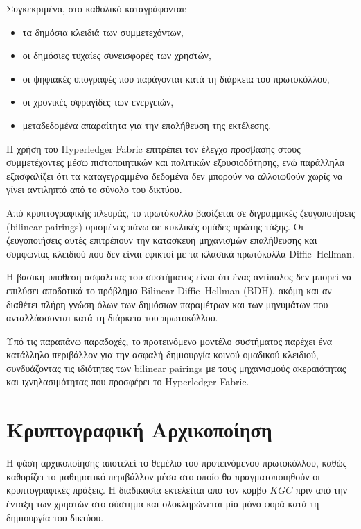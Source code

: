\documentclass[12pt,a4paper]{report}
\begin{document}
Συγκεκριμένα, στο καθολικό καταγράφονται:

\begin{itemize}
\item τα δημόσια κλειδιά των συμμετεχόντων,
\item οι δημόσιες τυχαίες συνεισφορές των χρηστών,
\item οι ψηφιακές υπογραφές που παράγονται κατά τη διάρκεια του πρωτοκόλλου,
\item οι χρονικές σφραγίδες των ενεργειών,
\item μεταδεδομένα απαραίτητα για την επαλήθευση της εκτέλεσης.
\end{itemize}

Η χρήση του Hyperledger Fabric επιτρέπει τον έλεγχο πρόσβασης στους συμμετέχοντες μέσω πιστοποιητικών και πολιτικών εξουσιοδότησης, ενώ παράλληλα εξασφαλίζει ότι τα καταγεγραμμένα δεδομένα δεν μπορούν να αλλοιωθούν χωρίς να γίνει αντιληπτό από το σύνολο του δικτύου.

Από κρυπτογραφικής πλευράς, το πρωτόκολλο βασίζεται σε διγραμμικές ζευγοποιήσεις (bilinear pairings) ορισμένες πάνω σε κυκλικές ομάδες πρώτης τάξης. Οι ζευγοποιήσεις αυτές επιτρέπουν την κατασκευή μηχανισμών επαλήθευσης και συμφωνίας κλειδιού που δεν είναι εφικτοί με τα κλασικά πρωτόκολλα Diffie--Hellman.

Η βασική υπόθεση ασφάλειας του συστήματος είναι ότι ένας αντίπαλος δεν μπορεί να επιλύσει αποδοτικά το πρόβλημα Bilinear Diffie--Hellman (BDH), ακόμη και αν διαθέτει πλήρη γνώση όλων των δημόσιων παραμέτρων και των μηνυμάτων που ανταλλάσσονται κατά τη διάρκεια του πρωτοκόλλου.

Υπό τις παραπάνω παραδοχές, το προτεινόμενο μοντέλο συστήματος παρέχει ένα κατάλληλο περιβάλλον για την ασφαλή δημιουργία κοινού ομαδικού κλειδιού, συνδυάζοντας τις ιδιότητες των bilinear pairings με τους μηχανισμούς ακεραιότητας και ιχνηλασιμότητας που προσφέρει το Hyperledger Fabric.

\section{Κρυπτογραφική Αρχικοποίηση}

Η φάση αρχικοποίησης αποτελεί το θεμέλιο του προτεινόμενου πρωτοκόλλου, καθώς καθορίζει το μαθηματικό περιβάλλον μέσα στο οποίο θα πραγματοποιηθούν οι κρυπτογραφικές πράξεις. Η διαδικασία εκτελείται από τον κόμβο $KGC$ πριν από την ένταξη των χρηστών στο σύστημα και ολοκληρώνεται μία μόνο φορά κατά τη δημιουργία του δικτύου.
\end{document}
